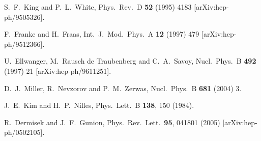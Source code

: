 \documentclass[aps,prl,twocolumn,nofootinbib,superscriptaddress]{revtex4}
\begin{document}
\begin{thebibliography}{99}
  S.~F.~King and P.~L.~White,
  Phys.\ Rev.\  D {\bf 52} (1995) 4183
  [arXiv:hep-ph/9505326].

  F.~Franke and H.~Fraas,
  Int.\ J.\ Mod.\ Phys.\  A {\bf 12} (1997) 479
  [arXiv:hep-ph/9512366].

  U.~Ellwanger, M.~Rausch de Traubenberg and C.~A.~Savoy,
  Nucl.\ Phys.\  B {\bf 492} (1997) 21
  [arXiv:hep-ph/9611251].


  D.~J.~Miller, R.~Nevzorov and P.~M.~Zerwas,
  Nucl.\ Phys.\  B {\bf 681} (2004) 3.
  
J.~E.~Kim and H.~P.~Nilles,
  Phys.\ Lett.\  B {\bf 138}, 150 (1984).

  R.~Dermisek and J.~F.~Gunion,
  Phys.\ Rev.\ Lett.\  {\bf 95}, 041801 (2005)
  [arXiv:hep-ph/0502105].



\end{thebibliography}
\end{document}
